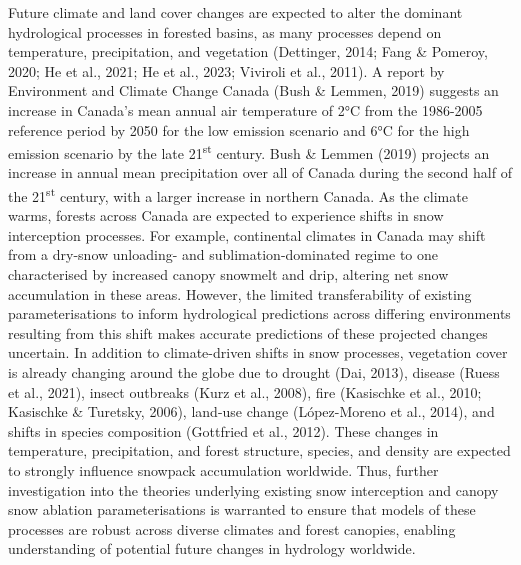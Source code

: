 \documentclass[
  letterpaper,
]{tex/uofsthesis-cs}
\begin{document}
Future climate and land cover changes are expected to alter the dominant
hydrological processes in forested basins, as many processes depend on
temperature, precipitation, and vegetation (Dettinger, 2014; Fang \&
Pomeroy, 2020; He et al., 2021; He et al., 2023; Viviroli et al., 2011).
A report by Environment and Climate Change Canada (Bush \& Lemmen, 2019)
suggests an increase in Canada's mean annual air temperature of 2°C from
the 1986-2005 reference period by 2050 for the low emission scenario and
6°C for the high emission scenario by the late 21\textsuperscript{st}
century. Bush \& Lemmen (2019) projects an increase in annual mean
precipitation over all of Canada during the second half of the
21\textsuperscript{st} century, with a larger increase in northern
Canada. As the climate warms, forests across Canada are expected to
experience shifts in snow interception processes. For example,
continental climates in Canada may shift from a dry-snow unloading- and
sublimation-dominated regime to one characterised by increased canopy
snowmelt and drip, altering net snow accumulation in these areas.
However, the limited transferability of existing parameterisations to
inform hydrological predictions across differing environments resulting
from this shift makes accurate predictions of these projected changes
uncertain. In addition to climate-driven shifts in snow processes,
vegetation cover is already changing around the globe due to drought
(Dai, 2013), disease (Ruess et al., 2021), insect outbreaks (Kurz et
al., 2008), fire (Kasischke et al., 2010; Kasischke \& Turetsky, 2006),
land-use change (López-Moreno et al., 2014), and shifts in species
composition (Gottfried et al., 2012). These changes in temperature,
precipitation, and forest structure, species, and density are expected
to strongly influence snowpack accumulation worldwide. Thus, further
investigation into the theories underlying existing snow interception
and canopy snow ablation parameterisations is warranted to ensure that
models of these processes are robust across diverse climates and forest
canopies, enabling understanding of potential future changes in
hydrology worldwide.
\end{document}
